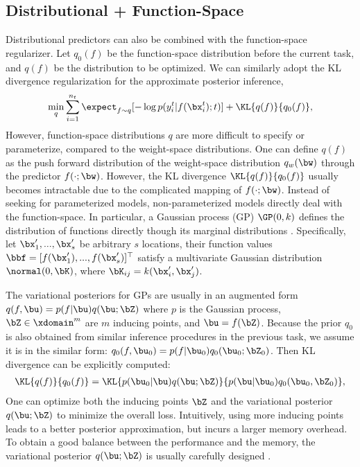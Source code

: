 \subsection{Distributional + Function-Space}
Distributional predictors can also be combined with the function-space regularizer. Let $q_0(f)$ be the function-space distribution before the current task, and $q(f)$ be the distribution to be optimized. We can similarly adopt the KL divergence regularization for the approximate posterior inference,
\begin{align}
    \min_{q} \sum_{i=1}^{n_t} \expect_{f \sim q} [ -\log p(y_i^t|f(\bx_i^t); t) ] + \KL{q(f)}{q_0(f)},
\end{align}
However, function-space distributions $q$ are more difficult to specify or parameterize, compared to the weight-space distributions. One can define $q(f)$ as the push forward distribution of the weight-space distribution $q_w(\bw)$ through the predictor $f(\cdot; \bw)$. However, the KL divergence $\KL{q(f)}{q_0(f)}$ usually becomes intractable due to the complicated mapping of $f(\cdot; \bw)$. Instead of seeking for parameterized models, non-parameterized models directly deal with the function-space. In particular, a Gaussian process  (GP) $\GP(0, k)$ defines the distribution of functions directly though its marginal distributions \citep{rasmussen2006gaussian}. Specifically, let $\bx'_1, ..., \bx'_s$ be arbitrary $s$ locations, their function values $\bbf = [f(\bx'_1), ..., f(\bx'_s)]^{\top}$ satisfy a multivariate Gaussian distribution $\normal(0, \bK)$, where $\bK_{ij}=k(\bx'_i, \bx'_j)$. 

The variational posteriors for GPs are usually in an augmented form $q(f, \bu) = p(f | \bu)q(\bu; \bZ)$ \citep{titsias2009variational} where $p$ is the Gaussian process, $\bZ \in \xdomain^m$ are $m$ inducing points, and $\bu = f(\bZ)$. Because the prior $q_0$ is also obtained from similar inference procedures in the previous task, we assume it is in the similar form: $q_0(f, \bu_0) = p(f | \bu_0)q_0(\bu_0; \bZ_0)$. Then KL divergence can be explicitly computed:
\begin{align}
    \KL{q(f)}{q_0(f)}=\KL{ p(\bu_0 | \bu)q(\bu; \bZ)}{p(\bu|\bu_0)q_0(\bu_0, \bZ_0)} ,
\end{align}
One can optimize both the inducing points $\bZ$ and the variational posterior $q(\bu; \bZ)$ to minimize the overall loss. Intuitively, using more inducing points leads to a better posterior approximation, but incurs a larger memory overhead. To obtain a good balance between the performance and the memory, the variational posterior $q(\bu; \bZ)$ is usually carefully designed  \citep{bui2017streaming, kapoor2020variational}.

